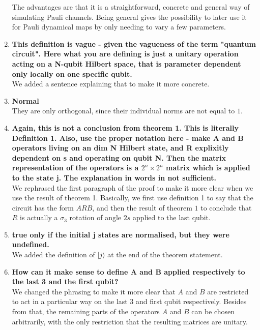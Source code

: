 \documentclass[10pt,letterpaper]{article} %
\begin{document}
\begin{enumerate}
The advantages are that it is a straightforward, concrete and general way
of simulating Pauli channels.
Being general gives the possibility to later use it for Pauli dynamical maps by only needing to vary a few parameters.


\item \textbf{This definition is vague - given the vagueness of the term "quantum circuit".
 Here what you are defining is just a unitary operation acting on a N-qubit Hilbert space, that is parameter dependent only locally on one specific qubit. } \\
 
We added a sentence explaining that to make it more concrete.

 
\item \textbf{Normal}\\

They are only orthogonal, since their individual norms are not equal to $1$.
 
\item \textbf{Again, this is not a conclusion from theorem 1. This is literally Definition 1. Also, use the proper notation here - make A and B operators living on an dim N Hilbert state, and R explixitly dependent on s and operating on qubit N. Then the matrix representation of the operators is a $2^n\times 2^n$ matrix which is applied to the state j. The explanation in words in not sufficient.} \\

We rephrased the first paragraph of the proof to make it more clear when we use the result of theorem 1. 
Basically, we first use definition 1 to say that the circuit has the form $ARB$,
and then the result of theorem $1$
to conclude that $R$ is actually a $\sigma_3$ rotation
of angle $2s$ applied to the last qubit.\\


\item \textbf{true only if the initial j states are normalised, but they were undefined.}\\

We added the definition of $|j\rangle$  at the end of the theorem statement.\\


\item \textbf{How can it make sense to define A and B applied respectively to the last 3 and the first qubit?}\\

We changed the phrasing to make it more clear that $A$ and $B$ 
are restricted to act in a particular way on the last 3 and first qubit respectively.
Besides from that, the remaining parts of the operators $A$ and $B$ can be chosen arbitrarily, 
with the only restriction that the resulting matrices are unitary. \\


\end{enumerate}
\end{document}

